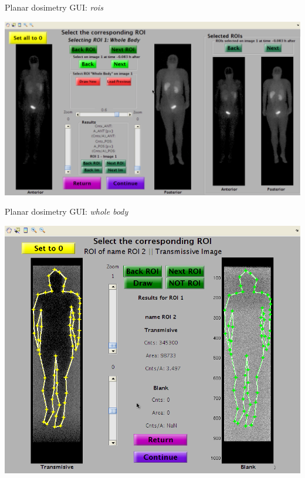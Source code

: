 \documentclass[ignorenonframetext,]{beamer}
\begin{document}
\begin{frame}{Planar dosimetry GUI: \emph{rois}}
\protect\hypertarget{planar-dosimetry-gui-rois}{}

\includegraphics{imgs/planar-rois.png}

\end{frame}

\begin{frame}{Planar dosimetry GUI: \emph{whole body}}
\protect\hypertarget{planar-dosimetry-gui-whole-body}{}

\begin{center}
\includegraphics[height=.8\textheight]{imgs/planar-wb.png}
\end{center}

\end{frame}
\end{document}
